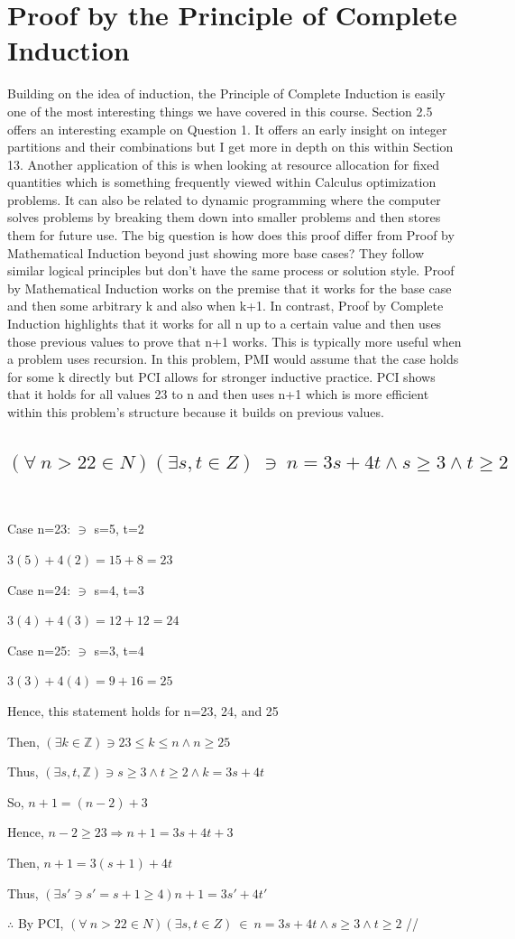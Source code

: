 \documentclass{article}
\begin{document}
\newpage
\section{Proof by the Principle of Complete Induction}
\justifying
Building on the idea of induction, the Principle of Complete Induction is easily one of the most interesting things we have covered in this course. Section 2.5 offers an interesting example on Question 1. It offers an early insight on integer partitions and their combinations but I get more in depth on this within Section 13. Another application of this is when looking at resource allocation for fixed quantities which is something frequently viewed within Calculus optimization problems. It can also be related to dynamic programming where the computer solves problems by breaking them down into smaller problems and then stores them for future use. The big question is how does this proof differ from Proof by Mathematical Induction beyond just showing more base cases? They follow similar logical principles but don't have the same process or solution style. Proof by Mathematical Induction works on the premise that it works for the base case and then some arbitrary k and also when k+1. In contrast, Proof by Complete Induction highlights that it works for all n up to a certain value and then uses those previous values to prove that n+1 works. This is typically more useful when a problem uses recursion. In this problem, PMI would assume that the case holds for some k directly but PCI allows for stronger inductive practice. PCI shows that it holds for all values 23 to n and then uses n+1 which is more efficient within this problem's structure because it builds on previous values.
\newpage

\subsection{$(\forall \ n>22 \in N) (\exists s, t \in Z) \ \ni \ n=3s+4t \wedge s \geq 3 \wedge t \geq 2$}
\
\begin{center}
\raggedright
Case n=23: $\ni$ s=5, t=2

$3(5)+4(2)=15+8=23$

Case n=24: $\ni$ s=4, t=3

$3(4)+4(3)=12+12=24$

Case n=25: $\ni$ s=3, t=4

$3(3)+4(4)=9+16=25$

Hence, this statement holds for n=23, 24, and 25

Then, $(\exists k \in \mathbb{Z}) \ni 23 \leq k \leq n \wedge n \geq 25$ 

Thus,  $(\exists s, t, \mathbb{Z}) \ni s \geq 3 \wedge t \geq 2 \wedge k=3s+4t$

So, $n+1=(n-2)+3$

Hence, $n-2 \geq  23 \Rightarrow n+1=3s+4t+3$

Then, $n+1=3(s+1)+4t$

Thus, $(\exists s' \ni s'=s+1 \geq 4) n+1=3s'+4t'$

$\therefore$ By PCI, $(\forall \ n>22 \in N) (\exists s, t \in Z) \ \in \ n=3s+4t \wedge s \geq 3 \wedge t \geq 2$  //


\end{center}
\end{document}
